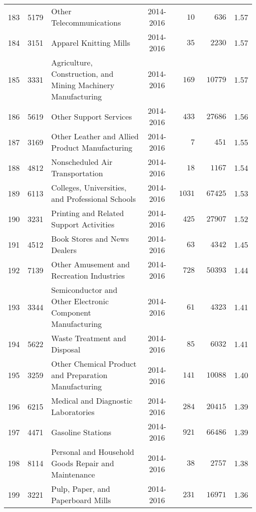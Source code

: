 \documentclass[9pt, oneside]{article}   	%
\begin{document}
\begin{longtable}{lcp{3in}cccc}
183  & 5179 & Other Telecommunications & 2014-2016 & $\phantom{000}10$ & $\phantom{000}636$ &  1.57 \\
184  & 3151 & Apparel Knitting Mills & 2014-2016 & $\phantom{000}35$ & $\phantom{00}2230$ &  1.57 \\
185  & 3331 & Agriculture, Construction, and Mining Machinery Manufacturing & 2014-2016 & $\phantom{00}169$ & $\phantom{0}10779$ &  1.57 \\
186  & 5619 & Other Support Services & 2014-2016 & $\phantom{00}433$ & $\phantom{0}27686$ &  1.56 \\
187  & 3169 & Other Leather and Allied Product Manufacturing & 2014-2016 & $\phantom{0000}7$ & $\phantom{000}451$ &  1.55 \\
188  & 4812 & Nonscheduled Air Transportation & 2014-2016 & $\phantom{000}18$ & $\phantom{00}1167$ &  1.54 \\
189  & 6113 & Colleges, Universities, and Professional Schools & 2014-2016 & $\phantom{0}1031$ & $\phantom{0}67425$ &  1.53 \\
190  & 3231 & Printing and Related Support Activities & 2014-2016 & $\phantom{00}425$ & $\phantom{0}27907$ &  1.52 \\
191  & 4512 & Book Stores and News Dealers & 2014-2016 & $\phantom{000}63$ & $\phantom{00}4342$ &  1.45 \\
192  & 7139 & Other Amusement and Recreation Industries & 2014-2016 & $\phantom{00}728$ & $\phantom{0}50393$ &  1.44 \\
193  & 3344 & Semiconductor and Other Electronic Component Manufacturing & 2014-2016 & $\phantom{000}61$ & $\phantom{00}4323$ &  1.41 \\
194  & 5622 & Waste Treatment and Disposal & 2014-2016 & $\phantom{000}85$ & $\phantom{00}6032$ &  1.41 \\
195  & 3259 & Other Chemical Product and Preparation Manufacturing & 2014-2016 & $\phantom{00}141$ & $\phantom{0}10088$ &  1.40 \\
196  & 6215 & Medical and Diagnostic Laboratories & 2014-2016 & $\phantom{00}284$ & $\phantom{0}20415$ &  1.39 \\
197  & 4471 & Gasoline Stations & 2014-2016 & $\phantom{00}921$ & $\phantom{0}66486$ &  1.39 \\
198  & 8114 & Personal and Household Goods Repair and Maintenance & 2014-2016 & $\phantom{000}38$ & $\phantom{00}2757$ &  1.38 \\
199  & 3221 & Pulp, Paper, and Paperboard Mills & 2014-2016 & $\phantom{00}231$ & $\phantom{0}16971$ &  1.36 \\

\end{longtable}
\end{document}
